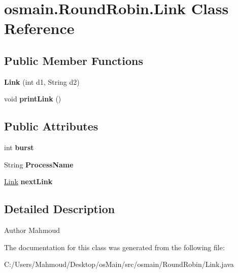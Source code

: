 \hypertarget{classosmain_1_1_round_robin_1_1_link}{}\section{osmain.\+Round\+Robin.\+Link Class Reference}
\label{classosmain_1_1_round_robin_1_1_link}
\subsection*{Public Member Functions}
\begin{DoxyCompactItemize}
\item 
{\bfseries Link} (int d1, String d2)\hypertarget{classosmain_1_1_round_robin_1_1_link_a123c64e14ab5f3a87bb64ef14071e0ca}{}\label{classosmain_1_1_round_robin_1_1_link_a123c64e14ab5f3a87bb64ef14071e0ca}

\item 
void {\bfseries print\+Link} ()\hypertarget{classosmain_1_1_round_robin_1_1_link_aede06f0cb3955c69d07371a393d977f5}{}\label{classosmain_1_1_round_robin_1_1_link_aede06f0cb3955c69d07371a393d977f5}

\end{DoxyCompactItemize}
\subsection*{Public Attributes}
\begin{DoxyCompactItemize}
\item 
int {\bfseries burst}\hypertarget{classosmain_1_1_round_robin_1_1_link_a4c0b1a9939fc5a3805a60a9a05b540b3}{}\label{classosmain_1_1_round_robin_1_1_link_a4c0b1a9939fc5a3805a60a9a05b540b3}

\item 
String {\bfseries Process\+Name}\hypertarget{classosmain_1_1_round_robin_1_1_link_a2559b98c4326f5f46dae5aaa8223c38e}{}\label{classosmain_1_1_round_robin_1_1_link_a2559b98c4326f5f46dae5aaa8223c38e}

\item 
\hyperlink{classosmain_1_1_round_robin_1_1_link}{Link} {\bfseries next\+Link}\hypertarget{classosmain_1_1_round_robin_1_1_link_a37b129d1ae0560b1a8298b2bf3ac79df}{}\label{classosmain_1_1_round_robin_1_1_link_a37b129d1ae0560b1a8298b2bf3ac79df}

\end{DoxyCompactItemize}


\subsection{Detailed Description}
\begin{DoxyAuthor}{Author}
Mahmoud 
\end{DoxyAuthor}


The documentation for this class was generated from the following file\+:\begin{DoxyCompactItemize}
\item 
C\+:/\+Users/\+Mahmoud/\+Desktop/os\+Main/src/osmain/\+Round\+Robin/Link.\+java\end{DoxyCompactItemize}

